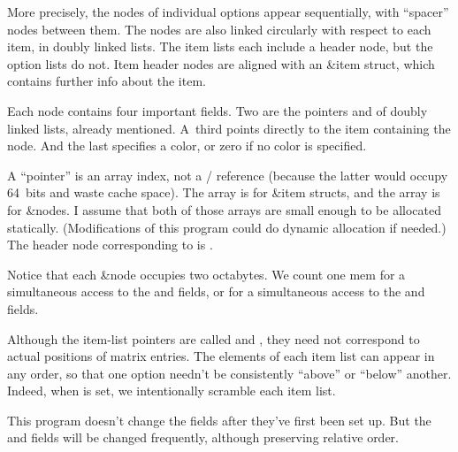 More precisely, the nodes of individual options appear sequentially,
with ``spacer'' nodes between them. The nodes are also
linked circularly with respect to each item, in doubly linked lists.
The item lists each include a header node, but the option lists do not.
Item header nodes are aligned with an \&{item} struct, which
contains further info about the item.

Each node contains four important fields. Two are the pointers 
and  of doubly linked lists, already mentioned.
A~third points directly to the item containing the node.
And the last specifies a color, or zero if no color is specified.

A ``pointer'' is an array index, not a \CEE/ reference (because the latter
would occupy 64~bits and waste cache space). The  array is for
\&{item} structs, and the  array is for \&{node}s. I assume that
both of
those arrays are small enough to be allocated statically. (Modifications
of this program could do dynamic allocation if needed.)
The header node corresponding to  is .

Notice that each \&{node} occupies two octabytes.
We count one mem for a simultaneous access to the  and 
fields,
or for a simultaneous access to the  and  fields.

Although the item-list pointers are called  and , they
need not
correspond to actual positions of matrix entries. The elements of
each item list can appear in any order, so that one option
needn't be consistently ``above'' or ``below'' another. Indeed, when
 is set, we intentionally scramble each item list.

This program doesn't change the  fields after they've first been
set up.
But the  and  fields will be changed frequently,
although preserving
relative order.

